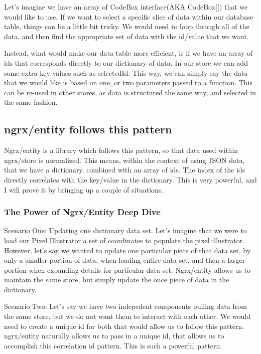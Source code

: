 Let's imagine we have an array of CodeBox interface(AKA CodeBox[]) that we would
like to use. If we want to select a specific slice of data within our database
table, things can be a little bit tricky. We would need to loop through all of
the data, and then find the appropriate set of data with the id/value that we
want.

Instead, what would make our data table more efficient, is if we have an array
of ids that corresponds directly to our dictionary of data. In our store we can
add some extra key values such as selectedId. This way, we can simply say the
data that we would like is based on one, or two parameters passed to a function.
This can be re-used in other stores, as data is structured the same way, and
selected in the same fashion.

\subsection{ngrx/entity follows this pattern}
Ngrx/entity is a library which follows this pattern, so that data used within
ngrx/store is normalized. This means, within the context of using JSON data,
that we have a dictionary, combined with an array of ids. The index of the ids
directly correlates with the key/value in the dictionary. This is very powerful,
and I will prove it by bringing up a couple of situations.

\subsubsection{The Power of Ngrx/Entity Deep Dive}
Scenario One:
Updating one dictionary data set. Let's imagine that we were to load our
Pixel Illustrator a set of coordinates to populate the pixel illustrator. However,
let's say we wanted to update one particular piece of that data set, by only
a smaller portion of data, when loading entire data set, and then a larger portion
when expanding details for particular data set. Ngrx/entity allows us to maintain
the same store, but simply update the once piece of data in the dictionary.

Scenario Two:
Let's say we have two indepedent components pulling data from the same store,
but we do not want them to interact with each other. We would need to create a
unique id for both that would allow us to follow this pattern. ngrx/entity
naturally allows us to pass in a unique id, that allows us to accomplish this
correlation id pattern. This is such a powerful pattern.


